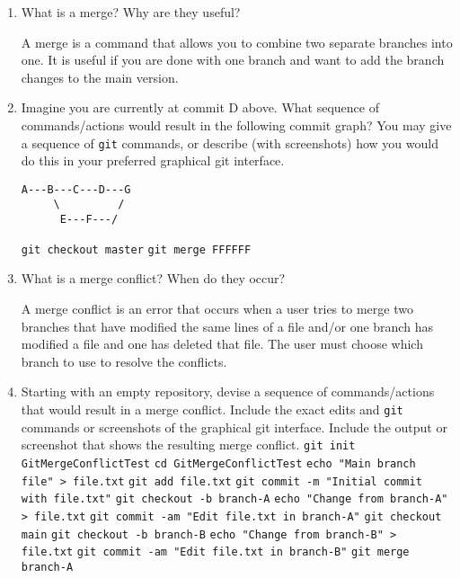 \documentclass[10pt,twocolumn]{article}
\begin{document}
\begin{enumerate}
\item What is a merge? Why are they useful?\newline
\par A merge is a command that allows you to combine two separate branches into one. It is useful if you are done with one branch and want to add the branch changes to the main version. \newline
\item Imagine you are currently at commit D above. What sequence of commands/actions would result in the following commit graph? You may give a sequence of \texttt{git}
commands, or describe (with screenshots) how you would do this in your preferred graphical git interface.\newline
\begin{verbatim}
A---B---C---D---G
     \         /
      E---F---/
\end{verbatim}
\par 
\texttt{git checkout master}\newline
\texttt{git merge FFFFFF}\newline
\item What is a merge conflict? When do they occur?\newline
\par A merge conflict is an error that occurs when a user tries to merge two branches that have modified the same lines of a file and/or one branch has modified a file and one has deleted that file. The user must choose which branch to use to resolve the conflicts. \newline
\item Starting with an empty repository, devise a sequence of commands/actions that would result in a merge conflict. Include the exact edits and \texttt{git} commands or screenshots of the graphical git interface. Include the output or screenshot that shows the resulting merge conflict.\newline\newline
\texttt{git init GitMergeConflictTest}\newline
\texttt{cd GitMergeConflictTest}\newline
\texttt{echo "Main branch file" > file.txt}\newline
\texttt{git add file.txt}\newline
\texttt{git commit -m "Initial commit with file.txt"}\newline
\texttt{git checkout -b branch-A}\newline
\texttt{echo "Change from branch-A" > file.txt}\newline
\texttt{git commit -am "Edit file.txt in branch-A"}\newline
\texttt{git checkout main}\newline
\texttt{git checkout -b branch-B}\newline
\texttt{echo "Change from branch-B" > file.txt}\newline
\texttt{git commit -am "Edit file.txt in branch-B"}\newline
\texttt{git merge branch-A}\newline

\end{enumerate}
\end{document}
